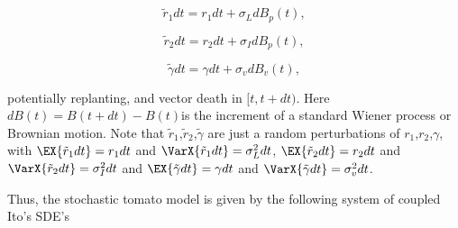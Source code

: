 \begin{equation}\label{eq1}
	\tilde{r}_1 dt = r_1 dt+\sigma_LdB_p(t),
\end{equation}

\begin{equation}\label{eq2}
\tilde{r}_2 dt = r_2 dt+\sigma_IdB_p(t),
\end{equation}

\begin{equation}\label{eq3}
\tilde{\gamma} dt = \gamma dt+\sigma_vdB_v(t),
\end{equation}

potentially replanting, and vector death  in $[t, t + dt)$. Here $dB(t) =B(t+dt)-B(t)$is the increment of a standard Wiener process or Brownian motion. Note that $\tilde{r}_1$,$\tilde{r}_2$,$\tilde{\gamma}$ are just a random perturbations of $r_1$,$r_2$,$\gamma$, with $\EX{\tilde{r}_1dt} = r_1dt$ and $\VarX{\tilde{r}_1dt} = \sigma_L^2dt$, $\EX{\tilde{r}_2dt} = r_2dt$ and $\VarX{\tilde{r}_2dt} = \sigma_I^2dt$ and $\EX{\tilde{\gamma}dt} = \gamma dt$ and $\VarX{\tilde{\gamma}dt} = \sigma_v^2dt$.

Thus, the stochastic tomato model is given by the following system of coupled Ito's SDE's

